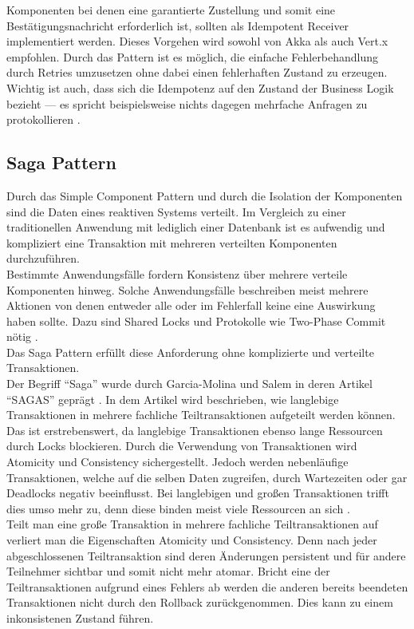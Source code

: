 Komponenten bei denen eine garantierte Zustellung und somit eine Bestätigungsnachricht erforderlich ist, sollten als Idempotent Receiver implementiert werden. Dieses Vorgehen wird sowohl von Akka als auch Vert.x empfohlen. Durch das Pattern ist es möglich, die einfache Fehlerbehandlung durch Retries umzusetzen ohne dabei einen fehlerhaften Zustand zu erzeugen. Wichtig ist auch, dass sich die Idempotenz auf den Zustand der Business Logik bezieht --- es spricht beispielsweise nichts dagegen mehrfache Anfragen zu protokollieren \cite[S.~216]{newman_building_2015}.

\pagebreak

\subsection{Saga Pattern}\label{subsec:saga-pattern}
Durch das Simple Component Pattern und durch die Isolation der Komponenten sind die Daten eines reaktiven Systems verteilt. Im Vergleich zu einer traditionellen Anwendung mit lediglich einer Datenbank ist es aufwendig und kompliziert eine Transaktion mit mehreren verteilten Komponenten durchzuführen.\\
Bestimmte Anwendungsfälle fordern Konsistenz über mehrere verteile Komponenten hinweg. Solche Anwendungsfälle beschreiben meist mehrere Aktionen von denen entweder alle oder im Fehlerfall keine eine Auswirkung haben sollte. Dazu sind Shared Locks und Protokolle wie Two-Phase Commit nötig \cite{mccaffrey_goto_2015}.\\

Das Saga Pattern erfüllt diese Anforderung ohne komplizierte und verteilte Transaktionen.\\
Der Begriff \enquote{Saga} wurde durch Garcia-Molina und Salem in deren Artikel \enquote{SAGAS} geprägt \cite{garcia-molina_sagas_1987}. In dem Artikel wird beschrieben, wie langlebige Transaktionen in mehrere fachliche Teiltransaktionen aufgeteilt werden können. Das ist erstrebenswert, da langlebige Transaktionen ebenso lange Ressourcen durch Locks blockieren. Durch die Verwendung von Transaktionen wird Atomicity und Consistency sichergestellt. Jedoch werden nebenläufige Transaktionen, welche auf die selben Daten zugreifen, durch Wartezeiten oder gar Deadlocks negativ beeinflusst. Bei langlebigen und großen Transaktionen trifft dies umso mehr zu, denn diese binden meist viele Ressourcen an sich \cite[S.~307]{kuhn_reactive_2015}.\\
Teilt man eine große Transaktion in mehrere fachliche Teiltransaktionen auf verliert man die Eigenschaften Atomicity und Consistency. Denn nach jeder abgeschlossenen Teiltransaktion sind deren Änderungen persistent und für andere Teilnehmer sichtbar und somit nicht mehr atomar. Bricht eine der Teiltransaktionen aufgrund eines Fehlers ab werden die anderen bereits beendeten Transaktionen nicht durch den Rollback zurückgenommen. Dies kann zu einem inkonsistenen Zustand \mbox{führen}.\\

